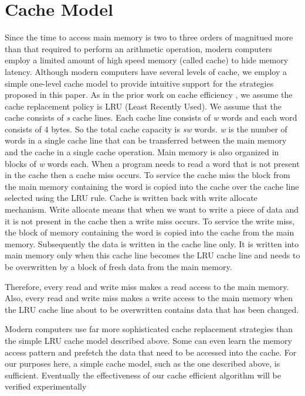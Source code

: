 \documentclass[conference]{IEEEtran}
\begin{document}
\section{Cache Model}
\label{sec:CacheModel}
Since the time to access main memory is two to three orders of magnitued more than that required to perform an arithmetic operation, modern computers employ a limited amount of high speed memory (called cache) to hide memory latency. Although modern computers have several levels of cache, we employ a simple one-level cache model to provide intuitive support for the strategies proposed in this paper.
As in the prior work on cache efficiency \cite{chunchun-sahni}, we assume the cache replacement policy is LRU (Least Recently Used). We assume that the cache consists of \textit{s} cache lines. Each cache line consists of \textit{w} words and each word consists of 4 bytes. So the total cache capacity is \textit{sw} words. \textit{w} is the number of words in a single cache line that can be transferred between the main memory and the cache in a single cache operation. Main memory is also organized in blocks of \textit{w} words each. When a program needs to read a word that is not present in the cache then a cache miss occurs. To service the cache miss the block from the main memory containing the word is copied into the cache over the cache line selected using the LRU rule. Cache is written back with write allocate mechanism. Write allocate means that when we want to write a piece of data and it is not present in the cache then a write miss occurs. To service the write miss, the block of memory containing the word is copied into the cache from the main memory. Subsequently the data is written in the cache line only. It is written into main memory only when this cache line becomes the LRU cache line and needs to be overwritten by a block of fresh data from the main memory.

Therefore, every read and write miss makes a read access to the main memory. Also, every read and write miss makes a write access to the main memory when the LRU cache line about to be overwritten contains data that has been changed.

Modern computers use far more sophisticated cache replacement strategies than the simple LRU cache model described above. Some can even learn the memory access pattern and prefetch the data that need to be accessed into the cache. For our
purposes here, a simple cache model, such as the one described above, is sufficient. Eventually the effectiveness of our cache efficient algorithm will be verified experimentally
\end{document}

